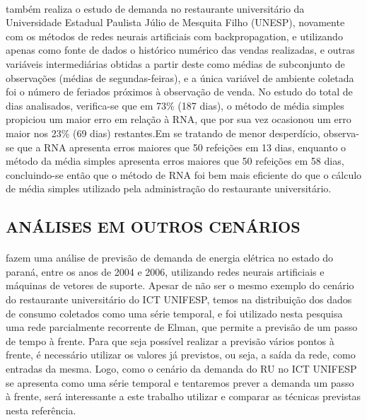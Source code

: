 \documentclass[	12pt, Times, openright, twoside, a4paper, english, brazil]{abntex2}
\begin{document}
        \paragraph*{} \cite{Rocha2011} também realiza o estudo de demanda no restaurante universitário da Universidade Estadual Paulista Júlio de Mesquita Filho (UNESP), novamente com os métodos de redes neurais artificiais com backpropagation, e utilizando apenas como fonte de dados o histórico numérico das vendas realizadas, e outras variáveis intermediárias obtidas a partir deste como médias de subconjunto de observações (médias de segundas-feiras), e a única variável de ambiente coletada foi o número de feriados próximos à observação de venda. No estudo do total de dias analisados, verifica-se que em 73\% (187 dias), o método de média simples propiciou um maior erro em relação à RNA, que por sua vez ocasionou um erro maior nos 23\% (69 dias) restantes.Em se tratando de menor desperdício, observa-se que a RNA apresenta erros maiores que 50 refeições em 13 dias, enquanto o método da média simples apresenta erros maiores que 50 refeições em 58 dias, concluindo-se então que o método de RNA foi bem mais eficiente do que o cálculo de média simples utilizado pela administração do restaurante universitário.
      
      \subsection{ANÁLISES EM OUTROS CENÁRIOS} 
        \paragraph*{} \cite{Ruas2012} fazem uma análise de previsão de demanda de energia elétrica no estado do paraná, entre os anos de 2004 e 2006, utilizando redes neurais artificiais e máquinas de vetores de suporte. Apesar de não ser o mesmo exemplo do cenário do restaurante universitário do ICT UNIFESP, temos na distribuição dos dados de consumo coletados como uma série temporal, e foi utilizado nesta pesquisa uma rede parcialmente recorrente de Elman, que permite a previsão de um passo de tempo à frente. Para que seja possível realizar a previsão vários pontos à frente, é necessário utilizar os valores já previstos, ou seja, a saída da rede, como entradas da mesma. Logo, como o cenário da demanda do RU no ICT UNIFESP se apresenta como uma série temporal e tentaremos prever a demanda um passo à frente, será interessante a este trabalho utilizar e comparar as técnicas previstas nesta referência.
        
\end{document}
